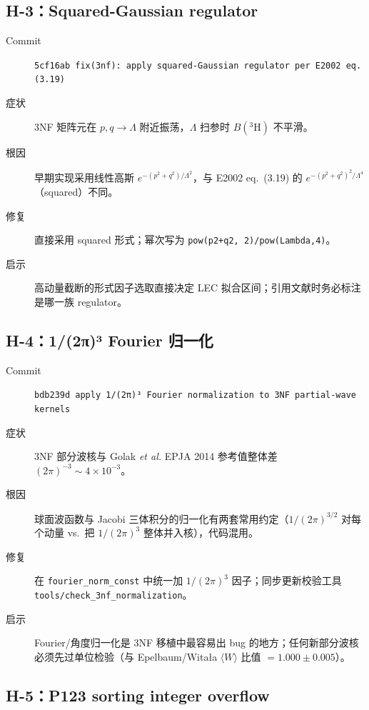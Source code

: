 \subsection{H-3：Squared-Gaussian regulator}

\begin{description}
  \item[Commit] \texttt{5cf16ab fix(3nf): apply squared-Gaussian regulator per E2002 eq. (3.19)}
  \item[症状] 3NF 矩阵元在 \(p,q\to\Lambda\) 附近振荡，\(\Lambda\) 扫参时 \(B(^3\!\mathrm{H})\) 不平滑。
  \item[根因] 早期实现采用线性高斯 \(e^{-(p^2+q^2)/\Lambda^2}\)，与 E2002 eq.~(3.19) 的 \(e^{-(p^2+q^2)^2/\Lambda^4}\)（squared）不同。
  \item[修复] 直接采用 squared 形式；幂次写为 \texttt{pow(p2+q2, 2)/pow(Lambda,4)}。
  \item[启示] 高动量截断的形式因子选取直接决定 LEC 拟合区间；引用文献时务必标注是哪一族 regulator。
\end{description}

\subsection{H-4：1/(2π)³ Fourier 归一化}

\begin{description}
  \item[Commit] \texttt{bdb239d apply 1/(2π)³ Fourier normalization to 3NF partial-wave kernels}
  \item[症状] 3NF 部分波核与 Golak \emph{et al.} EPJA 2014 参考值整体差 \((2\pi)^{-3}\sim 4\times 10^{-3}\)。
  \item[根因] 球面波函数与 Jacobi 三体积分的归一化有两套常用约定（\(1/(2\pi)^{3/2}\) 对每个动量 vs.~把 \(1/(2\pi)^3\) 整体并入核），代码混用。
  \item[修复] 在 \texttt{fourier\_norm\_const} 中统一加 \(1/(2\pi)^3\) 因子；同步更新校验工具 \texttt{tools/check\_3nf\_normalization}。
  \item[启示] Fourier/角度归一化是 3NF 移植中最容易出 bug 的地方；任何新部分波核必须先过单位检验（与 Epelbaum/Witała \(\langle W\rangle\) 比值 \(=1.000\pm 0.005\)）。
\end{description}

\subsection{H-5：P123 sorting integer overflow}

